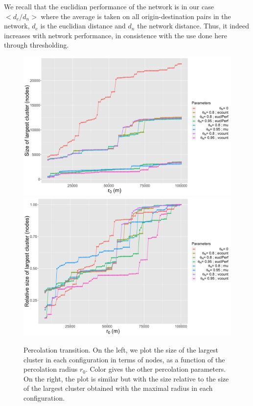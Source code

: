 \documentclass{article}
\begin{document}
We recall that the euclidian performance of the network \citep{banos2012towards} is in our case $<d_e/d_n>$ where the average is taken on all origin-destination pairs in the network, $d_e$ is the euclidian distance and $d_n$ the network distance. Thus, it indeed increases with network performance, in consistence with the use done here through thresholding.




\begin{figure}[ht] 
  {\includegraphics[width=0.49\linewidth]{abssize_nodes.png}}
  {\includegraphics[width=0.49\linewidth]{relsize_nodes.png}}
  \centering
  \caption{Percolation transition. On the left, we plot the size of the largest cluster in each configuration in terms of nodes, as a function of the percolation radius $r_0$. Color gives the other percolation parameters. On the right, the plot is similar but with the size relative to the size of the largest cluster obtained with the maximal radius in each configuration.\label{fig:percolation}}
\end{figure}
\end{document}
